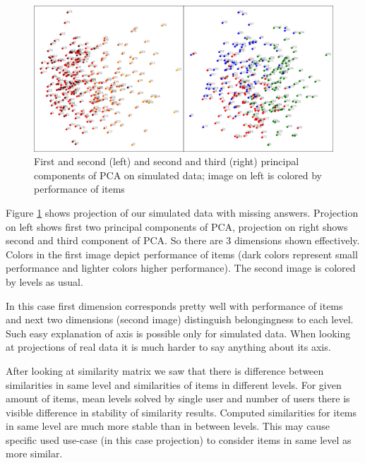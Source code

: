 \documentclass[
  digital, %
  table,   %
  nolof,     %
  nolot,     %
  nocover,
  color
]{fithesis3}
\begin{document}

\begin{figure}
  \includegraphics[width=\textwidth]{img/simulated_missing}
  \caption{First and second (left) and second and third (right) principal components of PCA on simulated data; image on left is colored by performance of items}
  \label{fig:simulated_missing}
\end{figure}

Figure \ref{fig:simulated_missing} shows projection of our simulated data with missing answers. Projection on left shows first two principal components of PCA, projection on right shows second and third component of PCA. So there are 3 dimensions shown effectively. Colors in the first image depict performance of items (dark colors represent small performance and lighter colors higher performance). The second image is colored by levels as usual.

In this case first dimension corresponds pretty well with performance of items and next two dimensions (second image) distinguish belongingness to each level. Such easy explanation of axis is possible only for simulated data. When looking at projections of real data it is much harder to say anything about its axis.

After looking at similarity matrix we saw that there is difference between similarities in same level and similarities of items in different levels. For given amount of items, mean levels solved by single user and number of users there is visible difference in stability of similarity results. Computed similarities for items in same level are much more stable than in between levels. This may cause specific used use-case (in this case projection) to consider items in same level as more similar.
\end{document}

